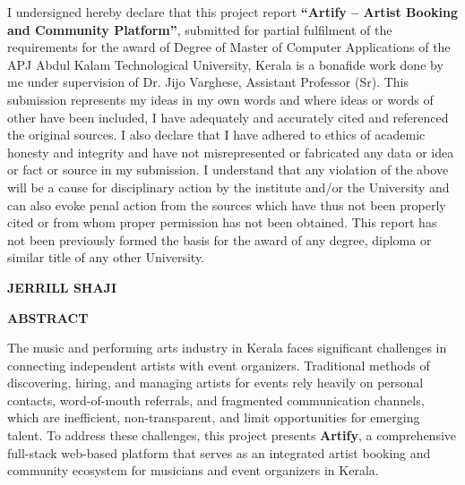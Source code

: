 \documentclass[12pt,a4paper]{report}
\begin{document}
\vspace{1cm}

I undersigned hereby declare that this project report \textbf{``Artify -- Artist Booking and Community Platform''}, submitted for partial fulfilment of the requirements for the award of Degree of Master of Computer Applications of the APJ Abdul Kalam Technological University, Kerala is a bonafide work done by me under supervision of Dr. Jijo Varghese, Assistant Professor (Sr). This submission represents my ideas in my own words and where ideas or words of other have been included, I have adequately and accurately cited and referenced the original sources. I also declare that I have adhered to ethics of academic honesty and integrity and have not misrepresented or fabricated any data or idea or fact or source in my submission. I understand that any violation of the above will be a cause for disciplinary action by the institute and/or the University and can also evoke penal action from the sources which have thus not been properly cited or from whom proper permission has not been obtained. This report has not been previously formed the basis for the award of any degree, diploma or similar title of any other University.

\vspace{2cm}

\noindent

\begin{minipage}{0.5\textwidth}
\end{minipage}
\hfill
\begin{minipage}{0.45\textwidth}
\begin{flushright}
\textbf{JERRILL SHAJI}
\end{flushright}
\end{minipage}

\vspace{0.5cm}

\noindent
{}
\newpage
\thispagestyle{empty}

\begin{center}
{\fontsize{16pt}{18pt}\selectfont\textbf{ABSTRACT}}
\end{center}
\vspace{1cm}
The music and performing arts industry in Kerala faces significant challenges in connecting independent artists with event organizers. Traditional methods of discovering, hiring, and managing artists for events rely heavily on personal contacts, word-of-mouth referrals, and fragmented communication channels, which are inefficient, non-transparent, and limit opportunities for emerging talent. To address these challenges, this project presents \textbf{Artify}, a comprehensive full-stack web-based platform that serves as an integrated artist booking and community ecosystem for musicians and event organizers in Kerala.
\end{document}
